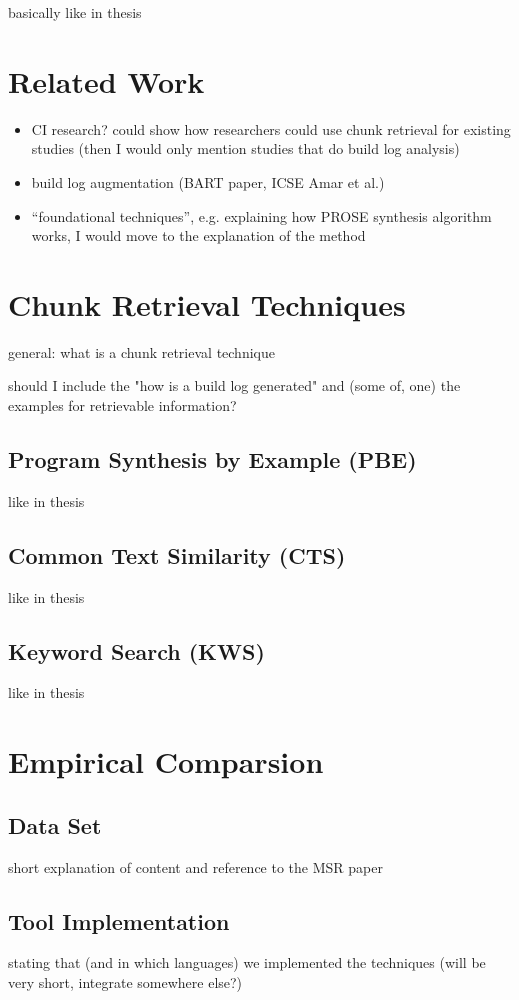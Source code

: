 
basically like in thesis

\section{Related Work}
\begin{itemize}
	\item CI research? could show how researchers could use chunk retrieval for existing studies (then I would only mention studies that do build log analysis)
	\item build log augmentation (BART paper, ICSE Amar et al.)
	\item ``foundational techniques'', e.g. explaining how PROSE synthesis algorithm works, I would move to the explanation of the method
\end{itemize}

\section{Chunk Retrieval Techniques}
general: what is a chunk retrieval technique

should I include the "how is a build log generated" and (some of, one) the examples for retrievable information?

\subsection{Program Synthesis by Example (PBE)}
like in thesis
\subsection{Common Text Similarity (CTS)}
like in thesis
\subsection{Keyword Search (KWS)}
like in thesis

\section{Empirical Comparsion}
\subsection{Data Set}
short explanation of content and reference to the MSR paper
\subsection{Tool Implementation}
stating that (and in which languages) we implemented the techniques (will be very short, integrate somewhere else?)
